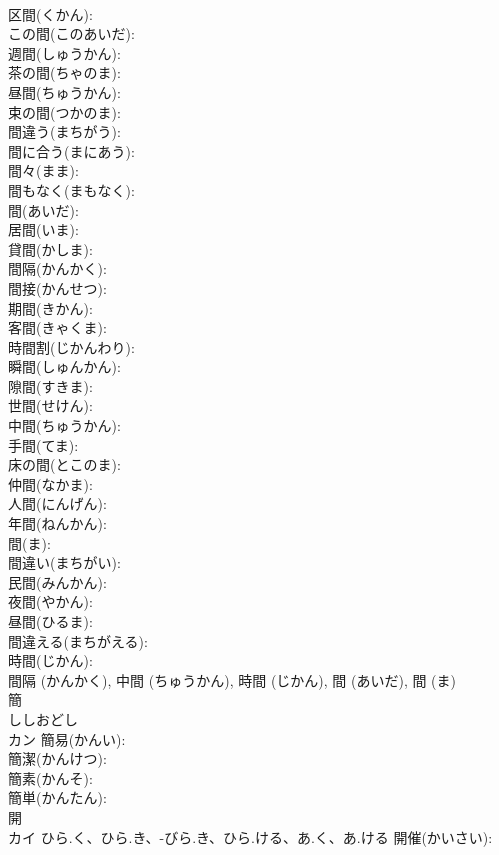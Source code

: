 \documentclass[8pt]{extreport}
\begin{document}
\begin{CJK}{UTF8}{min}
\\	区間(くかん): 
\\	この間(このあいだ): 
\\	週間(しゅうかん): 
\\	茶の間(ちゃのま): 
\\	昼間(ちゅうかん): 
\\	束の間(つかのま): 
\\	間違う(まちがう): 
\\	間に合う(まにあう): 
\\	間々(まま): 
\\	間もなく(まもなく): 
\\	間(あいだ): 
\\	居間(いま): 
\\	貸間(かしま): 
\\	間隔(かんかく): 
\\	間接(かんせつ): 
\\	期間(きかん): 
\\	客間(きゃくま): 
\\	時間割(じかんわり): 
\\	瞬間(しゅんかん): 
\\	隙間(すきま): 
\\	世間(せけん): 
\\	中間(ちゅうかん): 
\\	手間(てま): 
\\	床の間(とこのま): 
\\	仲間(なかま): 
\\	人間(にんげん): 
\\	年間(ねんかん): 
\\	間(ま): 
\\	間違い(まちがい): 
\\	民間(みんかん): 
\\	夜間(やかん): 
\\	昼間(ひるま): 
\\	間違える(まちがえる): 
\\	時間(じかん): 
\\	間隔 (かんかく), 中間 (ちゅうかん), 時間 (じかん), 間 (あいだ), 間 (ま)
\\	簡			
\\	ししおどし 
\\	カン		簡易(かんい): 
\\	簡潔(かんけつ): 
\\	簡素(かんそ): 
\\	簡単(かんたん): 
\\	開			
\\	カイ	ひら.く、ひら.き、-びら.き、ひら.ける、あ.く、あ.ける	開催(かいさい): 

\end{CJK}
\end{document}
